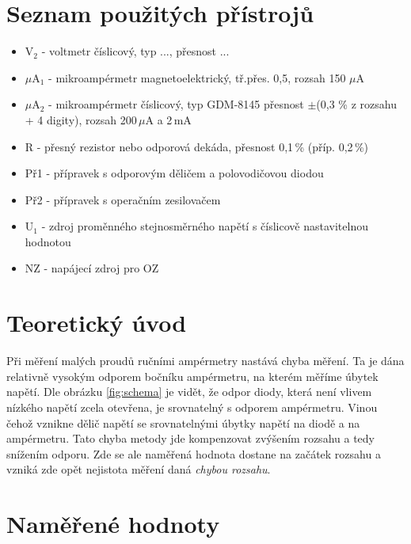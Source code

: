 \documentclass[a4paper,12pt]{article}   %
\newcommand{\tsub}[1]{$_\textrm{#1}$}
\newcommand{\tmu}{$\mu$}
\newcommand{\tpm}{$\pm$}
\begin{document}
\section{Seznam použitých přístrojů}

\begin{itemize}
    \item V\tsub{2} - voltmetr číslicový, typ ..., přesnost ...
    \item $\mu$A\tsub{1} - mikroampérmetr magnetoelektrický, tř.přes. 0,5, rozsah 150 \tmu A
    \item $\mu$A\tsub{2} - mikroampérmetr číslicový, typ GDM-8145 přesnost \tpm (0,3 \% z rozsahu + 4 digity), rozsah 200\,\tmu A a 2\,mA
    \item R - přesný rezistor nebo odporová dekáda, přesnost 0,1\,\% (příp. 0,2\,\%)
    \item Př1 - přípravek s odporovým děličem a polovodičovou diodou
    \item Př2 - přípravek s operačním zesilovačem
    \item U\tsub{1} - zdroj proměnného stejnosměrného napětí s číslicově nastavitelnou hodnotou 
    \item NZ - napájecí zdroj pro OZ
\end{itemize}



\section{Teoretický úvod}

Při měření malých proudů ručními ampérmetry nastává chyba měření. Ta je dána relativně vysokým odporem bočníku ampérmetru, na kterém měříme úbytek napětí. Dle obrázku \ref{fig:schema} je vidět, že odpor diody, která není vlivem nízkého napětí zcela otevřena, je srovnatelný s odporem ampérmetru. Vinou čehož vznikne dělič napětí se srovnatelnými úbytky napětí na diodě a na ampérmetru. Tato chyba metody jde kompenzovat zvýšením rozsahu a tedy snížením odporu. Zde se ale naměřená hodnota dostane na začátek rozsahu a vzniká zde opět nejistota měření daná \textit{chybou rozsahu}. 



\section{Naměřené hodnoty}
\end{document}

